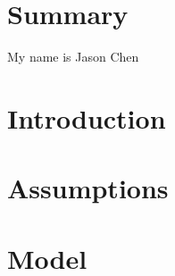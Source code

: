 \documentclass[12pt]{article}
\begin{document}
\cfoot{}


\section{Summary}
My name is Jason Chen

\newpage
\begin{center}
\end{center}

\newpage
\tableofcontents

\newpage
\section{Introduction}

\newpage
\section{Assumptions}

\newpage
\section{Model}
\end{document}
